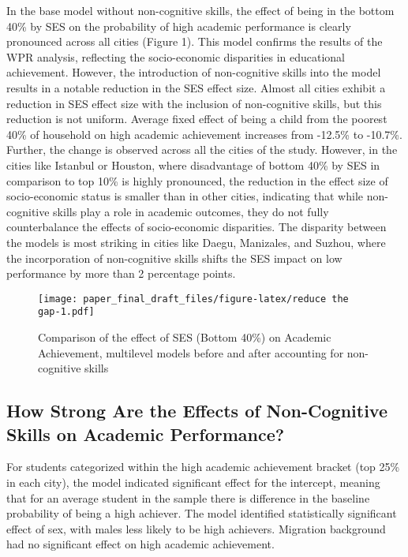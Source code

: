 \documentclass[
  12pt,
  a4paper,
]{article}
\begin{document}
In the base model without non-cognitive skills, the effect of being in
the bottom 40\% by SES on the probability of high academic performance
is clearly pronounced across all cities (Figure 1). This model confirms
the results of the WPR analysis, reflecting the socio-economic
disparities in educational achievement. However, the introduction of
non-cognitive skills into the model results in a notable reduction in
the SES effect size. Almost all cities exhibit a reduction in SES effect
size with the inclusion of non-cognitive skills, but this reduction is
not uniform. Average fixed effect of being a child from the poorest 40\%
of household on high academic achievement increases from -12.5\% to
-10.7\%. Further, the change is observed across all the cities of the
study. However, in the cities like Istanbul or Houston, where
disadvantage of bottom 40\% by SES in comparison to top 10\% is highly
pronounced, the reduction in the effect size of socio-economic status is
smaller than in other cities, indicating that while non-cognitive skills
play a role in academic outcomes, they do not fully counterbalance the
effects of socio-economic disparities. The disparity between the models
is most striking in cities like Daegu, Manizales, and Suzhou, where the
incorporation of non-cognitive skills shifts the SES impact on low
performance by more than 2 percentage points.

\begin{figure}
\centering
\texttt{[image: paper\_final\_draft\_files/figure-latex/reduce the gap-1.pdf]}
\caption{Comparison of the effect of SES (Bottom 40\%) on Academic
Achievement, multilevel models before and after accounting for
non-cognitive skills}
\end{figure}

\hypertarget{how-strong-are-the-effects-of-non-cognitive-skills-on-academic-performance}{%
\subsection{How Strong Are the Effects of Non-Cognitive Skills on
Academic
Performance?}\label{how-strong-are-the-effects-of-non-cognitive-skills-on-academic-performance}}

For students categorized within the high academic achievement bracket
(top 25\% in each city), the model indicated significant effect for the
intercept, meaning that for an average student in the sample there is
difference in the baseline probability of being a high achiever. The
model identified statistically significant effect of sex, with males
less likely to be high achievers. Migration background had no
significant effect on high academic achievement.
\end{document}
